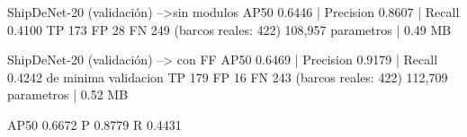ShipDeNet-20 (validación) -->sin modulos 
AP50 0.6446 | Precision 0.8607 | Recall 0.4100
TP 173  FP 28  FN 249  (barcos reales: 422)
108,957 parametros | 0.49 MB

ShipDeNet-20 (validación) --> con FF
AP50 0.6469 | Precision 0.9179 | Recall 0.4242 de minima validacion 
TP 179  FP 16  FN 243  (barcos reales: 422)
112,709 parametros | 0.52 MB

AP50 0.6672  P 0.8779  R 0.4431
